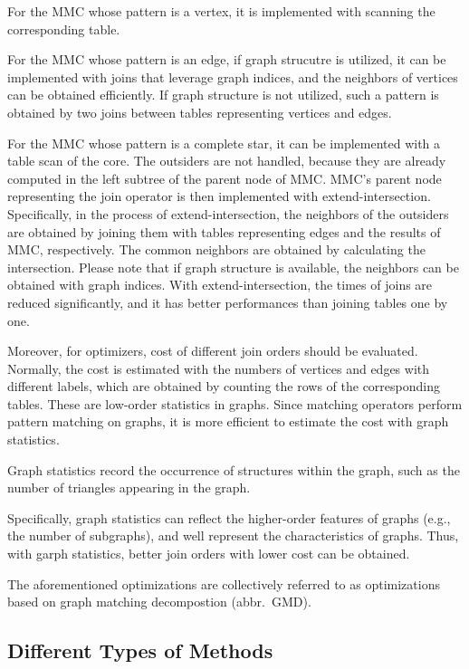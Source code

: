 For the MMC whose pattern is a vertex, it is implemented with scanning the corresponding table.

For the MMC whose pattern is an edge, if graph strucutre is utilized, it can be implemented with joins that leverage graph indices, and the neighbors of vertices can be obtained efficiently.
If graph structure is not utilized, such a pattern is obtained by two joins between tables representing vertices and edges.


For the MMC whose pattern is a complete star, it can be implemented with a table scan of the core.
The outsiders are not handled, because they are already computed in the left subtree of the parent node of MMC.
MMC's parent node representing the join operator is then implemented with extend-intersection.
Specifically, in the process of extend-intersection, the neighbors of the outsiders are obtained by joining them with tables representing edges and the results of MMC, respectively.
The common neighbors are obtained by calculating the intersection.
Please note that if graph structure is available, the neighbors can be obtained with graph indices.
With extend-intersection, the times of joins are reduced significantly, and it has better performances than joining tables one by one.


Moreover, for optimizers, cost of different join orders should be evaluated.
Normally, the cost is estimated with the numbers of vertices and edges with different labels, which are obtained by counting the rows of the corresponding tables.
These are low-order statistics in graphs.
Since matching operators perform pattern matching on graphs, it is more efficient to estimate the cost with graph statistics.

\begin{definition}
    Graph statistics record the occurrence of structures within the graph, such as the number of triangles appearing in the graph.
\end{definition}

Specifically, graph statistics can reflect the higher-order features of graphs (e.g., the number of subgraphs), and well represent the characteristics of graphs.
Thus, with garph statistics, better join orders with lower cost can be obtained.

The aforementioned optimizations are collectively referred to as optimizations based on graph matching decompostion (abbr.~GMD).


\subsection{Different Types of Methods}
\label{sec:different-type-of-methods}

